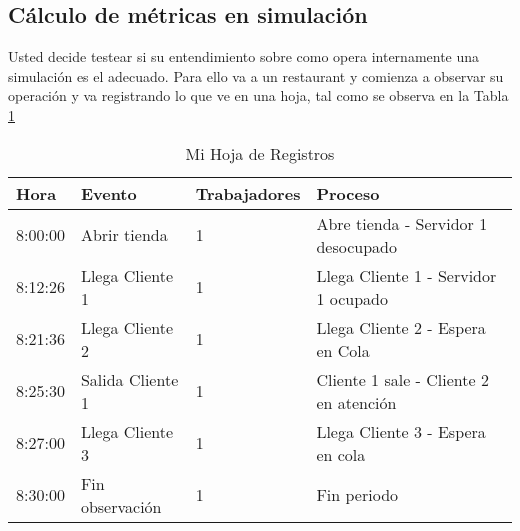 \documentclass[11pt]{exam}
\begin{document}
\begin{questions}

\section*{C\'alculo de m\'etricas en simulaci\'on}
\question Usted decide testear si su entendimiento sobre como opera internamente una simulaci\'on es el adecuado. Para ello va a un restaurant y comienza a observar su operaci\'on y va registrando lo que ve en una hoja, tal como se observa en la Tabla \ref{tab:1} 
\begin{table} \label{tab:1}
\center
\begin{tabular}{llll}
\hline
\textbf{Hora} & \textbf{Evento} & \textbf{Trabajadores} & \textbf{Proceso}                                                  \\ \hline
8:00:00               & Abrir tienda                & 1                     & Abre tienda - Servidor 1 desocupado                               \\
8:12:26            & Llega Cliente 1                & 1                     & Llega Cliente 1 - Servidor 1 ocupado                              \\
8:21:36            & Llega Cliente 2                & 1                     & Llega Cliente 2 - Espera en Cola                            \\
8:25:30          & Salida Cliente 1                & 1                     & Cliente 1 sale - Cliente 2 en atenci\'on                              \\
8:27:00           & Llega Cliente 3                & 1                     & Llega Cliente 3 - Espera en cola                                  \\
8:30:00           & Fin observaci\'on                & 1                     &Fin periodo                                 \\ \hline
\end{tabular}
\caption{Mi Hoja de Registros}
\end{table}

\end{questions}
\end{document}
